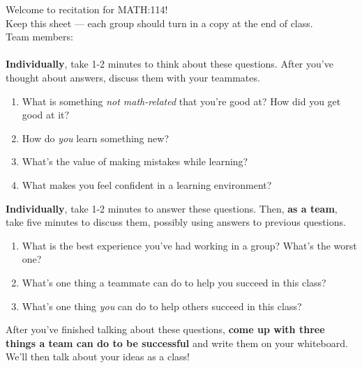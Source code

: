 \documentclass[12pt]{article}
\begin{document}
	\thispagestyle{empty}
	
	{\huge{Welcome to recitation for \textsc{MATH}:114!}} \\[1em]
	{\Large{Keep this sheet --- each group should turn in a copy at the end of class.}} \\[2em]
	
	Team members: \uline{\hfill} \\[1em]
	\phantom{}\uline{\hfill} \\[2em]
	
	\textbf{Individually}, take 1-2 minutes to think about these questions. After you've thought about answers, discuss them with your teammates.
	
	\begin{enumerate}
		\item What is something \textit{not math-related} that you're good at? How did you get good at it?
		\item How do \textit{you} learn something new?
		\item What's the value of making mistakes while learning?
		\item What makes you feel confident in a learning environment?
	\end{enumerate} \vspace{2em}
	
	\textbf{Individually}, take 1-2 minutes to answer these questions. Then, \textbf{as a team}, take five minutes to discuss them, possibly using answers to previous questions.
	
	\begin{enumerate}
		\item What is the best experience you've had working in a group? What's the worst one?
		\item What's one thing a teammate can do to help you succeed in this class?
		\item What's one thing \textit{you} can do to help others succeed in this class?
	\end{enumerate}
	
	\vspace{2em}
	
	After you've finished talking about these questions, \textbf{come up with three things a team can do to be successful} and write them on your whiteboard. We'll then talk about your ideas as a class!
\end{document}
